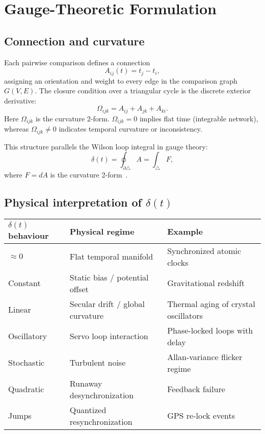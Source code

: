 \documentclass[11pt,a4paper]{article}
\begin{document}
\section{Gauge-Theoretic Formulation}

\subsection{Connection and curvature}
Each pairwise comparison defines a connection
\begin{equation}
A_{ij}(t) = t_j - t_i,
\end{equation}
assigning an orientation and weight to every edge in the comparison graph $G(V,E)$. 
The closure condition over a triangular cycle is the discrete exterior derivative:
\begin{equation}
\Omega_{ijk} = A_{ij} + A_{jk} + A_{ki}.
\end{equation}
\noindent
Here $\Omega_{ijk}$ is the curvature 2-form. 
$\Omega_{ijk}=0$ implies flat time (integrable network), whereas $\Omega_{ijk}\neq0$ indicates temporal curvature or inconsistency.

This structure parallels the Wilson loop integral in gauge theory:
\begin{equation}
\delta(t) = \oint_{\partial \triangle} A = \int_{\triangle} F,
\end{equation}
where $F=dA$ is the curvature 2-form~\citep{Frankel2011,Singer2011,Tartaglia2013}.

\subsection{Physical interpretation of $\delta(t)$}
\begin{center}
\begin{tabular}{lll}
\hline
$\delta(t)$ behaviour & Physical regime & Example \\ \hline
$\approx 0$ & Flat temporal manifold & Synchronized atomic clocks \\
Constant & Static bias / potential offset & Gravitational redshift \\
Linear & Secular drift / global curvature & Thermal aging of crystal oscillators \\
Oscillatory & Servo loop interaction & Phase-locked loops with delay \\
Stochastic & Turbulent noise & Allan-variance flicker regime \\
Quadratic & Runaway desynchronization & Feedback failure \\
Jumps & Quantized resynchronization & GPS re-lock events \\
\hline
\end{tabular}
\end{center}
\end{document}
